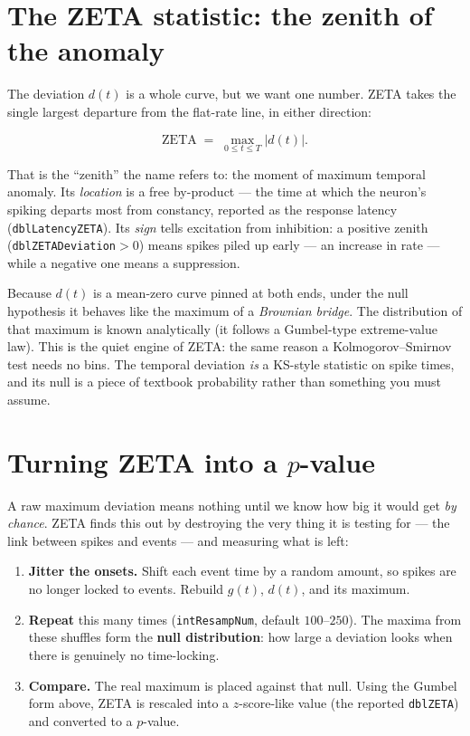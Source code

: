 \documentclass[11pt]{article}
\begin{document}
\section{The ZETA statistic: the zenith of the anomaly}

The deviation $d(t)$ is a whole curve, but we want one number. ZETA takes the
single largest departure from the flat-rate line, in either direction:

\[
  \mathrm{ZETA} \;=\; \max_{0 \le t \le T} \bigl| d(t) \bigr|.
\]

That is the ``zenith'' the name refers to: the moment of maximum temporal
anomaly. Its \emph{location} is a free by-product --- the time at which the
neuron's spiking departs most from constancy, reported as the response latency
(\texttt{dblLatencyZETA}). Its \emph{sign} tells excitation from inhibition: a
positive zenith (\texttt{dblZETADeviation}$>0$) means spikes piled up early ---
an increase in rate --- while a negative one means a suppression.

\begin{deepbox}
Because $d(t)$ is a mean-zero curve pinned at both ends, under the null
hypothesis it behaves like the maximum of a \emph{Brownian bridge}. The
distribution of that maximum is known analytically (it follows a Gumbel-type
extreme-value law). This is the quiet engine of ZETA: the same reason a
Kolmogorov--Smirnov test needs no bins. The temporal deviation \emph{is} a
KS-style statistic on spike times, and its null is a piece of textbook
probability rather than something you must assume.
\end{deepbox}

\section{Turning ZETA into a $p$-value}

A raw maximum deviation means nothing until we know how big it would get
\emph{by chance}. ZETA finds this out by destroying the very thing it is testing
for --- the link between spikes and events --- and measuring what is left:

\begin{enumerate}
  \item \textbf{Jitter the onsets.} Shift each event time by a random amount, so
        spikes are no longer locked to events. Rebuild $g(t)$, $d(t)$, and its
        maximum.
  \item \textbf{Repeat} this many times (\texttt{intResampNum}, default
        $100$--$250$). The maxima from these shuffles form the \textbf{null
        distribution}: how large a deviation looks when there is genuinely no
        time-locking.
  \item \textbf{Compare.} The real maximum is placed against that null. Using
        the Gumbel form above, ZETA is rescaled into a $z$-score-like value
        (the reported \texttt{dblZETA}) and converted to a $p$-value.
\end{enumerate}
\end{document}
